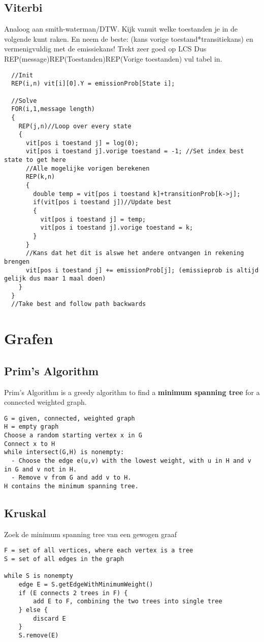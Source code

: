 \documentclass[a4paper,10pt,oneside]{report}
\begin{document}
\section{Viterbi}
Analoog aan smith-waterman/DTW. Kijk vanuit welke toestanden je in de volgende kunt raken. En neem de beste: (kans vorige toestand*transitiekans) en vermenigvuldig met de emissiekans! Trekt zeer goed op LCS
Dus REP(message)REP(Toestanden)REP(Vorige toestanden) vul tabel in.
\begin{verbatim}
  //Init
  REP(i,n) vit[i][0].Y = emissionProb[State i];
  
  //Solve
  FOR(i,1,message length)
  {
    REP(j,n)//Loop over every state
    {
      vit[pos i toestand j] = log(0);
      vit[pos i toestand j].vorige toestand = -1; //Set index best state to get here
      //Alle mogelijke vorigen berekenen
      REP(k,n)
      {
        double temp = vit[pos i toestand k]+transitionProb[k->j];
        if(vit[pos i toestand j])//Update best
        {
          vit[pos i toestand j] = temp;
          vit[pos i toestand j].vorige toestand = k;
        }
      }
      //Kans dat het dit is alswe het andere ontvangen in rekening brengen
      vit[pos i toestand j] += emissionProb[j]; (emissieprob is altijd gelijk dus maar 1 maal doen)
    }
  }
  //Take best and follow path backwards
\end{verbatim}
\chapter{Grafen}

\section {Prim's Algorithm}
Prim's Algorithm is a greedy algorithm to find a {\bf minimum spanning tree}
for a connected weighted graph.

\begin{verbatim}
G = given, connected, weighted graph
H = empty graph
Choose a random starting vertex x in G
Connect x to H
while intersect(G,H) is nonempty:
  - Choose the edge e(u,v) with the lowest weight, with u in H and v in G and v not in H.
  - Remove v from G and add v to H.
H contains the minimum spanning tree.
\end{verbatim}

\section{Kruskal}
Zoek de minimum spanning tree van een gewogen graaf
\begin{verbatim}
F = set of all vertices, where each vertex is a tree
S = set of all edges in the graph

while S is nonempty
    edge E = S.getEdgeWithMinimumWeight()
    if (E connects 2 trees in F) {
        add E to F, combining the two trees into single tree
    } else {
        discard E
    }
    S.remove(E)
\end{verbatim}
\end{document}
